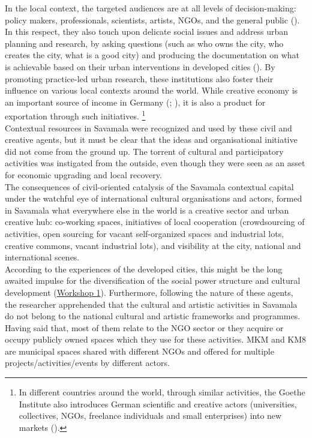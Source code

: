 \documentclass[11pt]{report}
\begin{document}
In the local context, the targeted audiences are at all levels of decision-making: policy makers, professionals, scientists, artists, NGOs, and the general public (\href{British}{\citealt{british_council_creativity_2014}}).
In this respect, they also touch upon delicate social issues and address urban planning and research, by asking questions (such as who owns the city, who creates the city, what is a good city) and producing the documentation on what is achievable based on their urban interventions in developed cities (\cite{Urban places public spaces}).
By promoting practice-led urban research, these institutions also foster their influence on various local contexts around the world.
While creative economy is an important source of income in Germany (\href{MFG}{\citealt{Creative industries on the rise}}; \href{BMWi}{\citealt{Monitoring on selected economic key data practice-based}}), it is also a product for exportation through such initiatives.
\footnote{In different countries around the world, through similar activities, the Goethe Institute also introduces German scientific and creative actors (universities, collectives, NGOs, freelance individuals and small enterprises) into new markets (\href{ref}{\citealt{waibel_creativity_2014}}).}
\\

Contextual resources in Savamala were recognized and used by these civil and creative agents, but it must be clear that the ideas and organisational initiative  did not come from the ground up.
The torrent of cultural and participatory activities was instigated from the outside, even though they were seen as an asset for economic upgrading and local recovery.
\\

The consequences of civil-oriented catalysis of the Savamala contextual capital under the watchful eye of international cultural organisations and actors, formed in Savamala what everywhere else in the world is a creative sector and urban creative hub: co-working spaces, initiatives of local cooperation (crowdsourcing of activities, open sourcing for vacant self-organized spaces and industrial lots, creative commons, vacant industrial lots), and visibility at the city, national and international scenes.
\\

According to the experiences of the developed cities, this might be the long awaited impulse for the diversification of the social power structure and cultural development 
(\href{Expert Workshop}{Workshop 1}).
Furthermore, following the nature of these agents, the researcher apprehended that the cultural and artistic activities in Savamala do not belong to the national cultural and artistic frameworks and programmes.
Having said that, most of them relate to the NGO sector or they acquire or occupy publicly owned spaces which they use for these activities.
MKM and KM8 are municipal spaces shared with different NGOs and offered for multiple projects/activities/events by different actors.
\\
\end{document}
